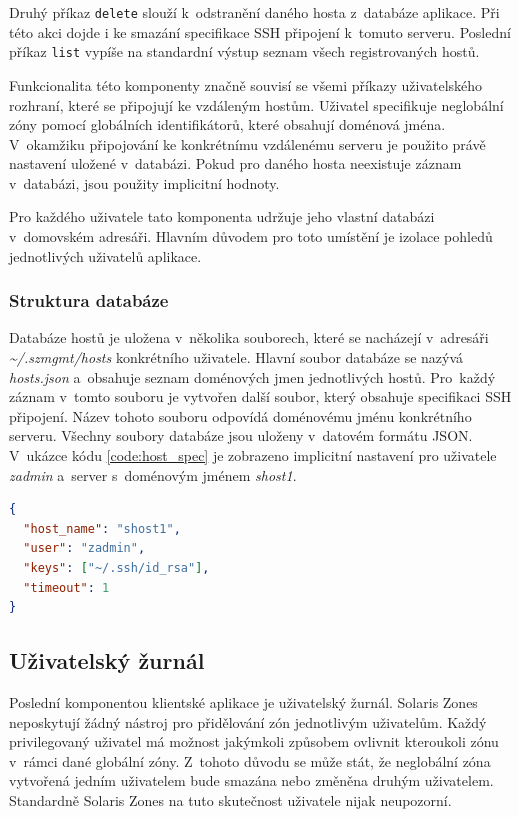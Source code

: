Druhý příkaz \verb|delete| slouží k~odstranění daného hosta z~databáze aplikace. Při této akci dojde i ke smazání specifikace
SSH připojení k~tomuto serveru. Poslední příkaz \verb|list| vypíše na standardní výstup seznam všech registrovaných hostů.

Funkcionalita této komponenty značně souvisí se všemi příkazy uživatelského rozhraní, které se připojují ke vzdáleným hostům.
Uživatel specifikuje neglobální zóny pomocí globálních identifikátorů, které obsahují doménová jména. V~okamžiku připojování
ke konkrétnímu vzdálenému serveru je použito právě nastavení uložené v~databázi. Pokud pro daného hosta neexistuje záznam
v~databázi, jsou použity implicitní hodnoty.

Pro každého uživatele tato komponenta udržuje jeho vlastní databázi v~domovském adresáři. Hlavním důvodem pro toto umístění
je izolace pohledů jednotlivých uživatelů aplikace.
\subsubsection{Struktura databáze}
\label{chapter:implementation:client:hosts:database}
Databáze hostů je uložena v~několika souborech, které se nacházejí v~adresáři \textit{\textasciitilde/.szmgmt/hosts} konkrétního uživatele.
Hlavní soubor databáze se nazývá \textit{hosts.json} a~obsahuje seznam doménových jmen jednotlivých hostů. Pro~každý záznam 
v~tomto souboru je vytvořen další soubor, který obsahuje specifikaci SSH připojení. Název tohoto souboru odpovídá doménovému
jménu konkrétního serveru. Všechny soubory databáze jsou uloženy v~datovém formátu JSON. V~ukázce kódu \ref{code:host_spec}
je zobrazeno implicitní nastavení pro uživatele \textit{zadmin} a~server s~doménovým jménem \textit{shost1}.
\begin{lstlisting}[language=json, caption={Implicitní nastavení parametrů SSH připojení}, float,label={code:host_spec}]  
{
  "host_name": "shost1",
  "user": "zadmin",
  "keys": ["~/.ssh/id_rsa"],
  "timeout": 1
}
\end{lstlisting}
\subsection{Uživatelský žurnál}
\label{chapter:implementation:client:journal}
Poslední komponentou klientské aplikace je uživatelský žurnál. Solaris Zones neposkytují žádný nástroj pro přidělování zón 
jednotlivým uživatelům. Každý privilegovaný uživatel má možnost jakýmkoli způsobem ovlivnit kteroukoli zónu v~rámci dané globální
zóny. Z~tohoto důvodu se může stát, že neglobální zóna vytvořená jedním uživatelem bude smazána nebo změněna druhým uživatelem.
Standardně Solaris Zones na tuto skutečnost uživatele nijak neupozorní. 

